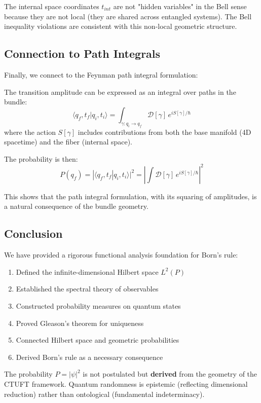 \begin{corollary}
The internal space coordinates $t_{int}$ are not "hidden variables" in the Bell sense because they are not local (they are shared across entangled systems). The Bell inequality violations are consistent with this non-local geometric structure.
\end{corollary}

\subsection{Connection to Path Integrals}

Finally, we connect to the Feynman path integral formulation:

\begin{theorem}
The transition amplitude can be expressed as an integral over paths in the bundle:
\begin{equation}
    \langle q_f, t_f | q_i, t_i \rangle = \int_{\gamma: q_i \to q_f} \mathcal{D}[\gamma] \, e^{iS[\gamma]/\hbar}
\end{equation}
where the action $S[\gamma]$ includes contributions from both the base manifold (4D spacetime) and the fiber (internal space).
\end{theorem}

The probability is then:
\begin{equation}
    P(q_f) = |\langle q_f, t_f | q_i, t_i \rangle|^2 = \left| \int \mathcal{D}[\gamma] \, e^{iS[\gamma]/\hbar} \right|^2
\end{equation}

This shows that the path integral formulation, with its squaring of amplitudes, is a natural consequence of the bundle geometry.

\subsection{Conclusion}

We have provided a rigorous functional analysis foundation for Born's rule:
\begin{enumerate}
    \item Defined the infinite-dimensional Hilbert space $L^2(P)$
    \item Established the spectral theory of observables
    \item Constructed probability measures on quantum states
    \item Proved Gleason's theorem for uniqueness
    \item Connected Hilbert space and geometric probabilities
    \item Derived Born's rule as a necessary consequence
\end{enumerate}

The probability $P = |\psi|^2$ is not postulated but \textbf{derived} from the geometry of the CTUFT framework. Quantum randomness is epistemic (reflecting dimensional reduction) rather than ontological (fundamental indeterminacy).

